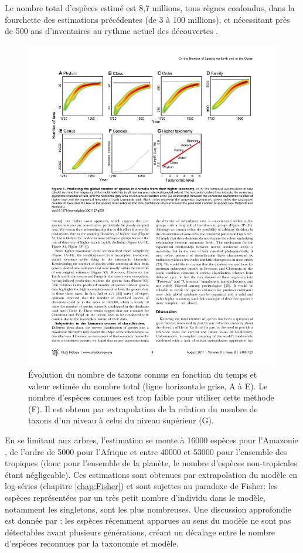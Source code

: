 \documentclass[
  11pt,
  french,
  a4paper,
  extrafontsizes,onecolumn,openright
  ]{memoir}
\begin{document}
Le nombre total d'espèces estimé est 8,7 millions, tous règnes confondus, dans la fourchette des estimations précédentes (de 3 à 100 millions), et nécessitant près de 500 ans d'inventaires au rythme actuel des découvertes \autocite{May2011}.



\scriptsize

\begin{figure}

{\centering \includegraphics[width=0.8\linewidth]{images/Mora2011} 

}

\caption{Évolution du nombre de taxons connus en fonction du temps et valeur estimée du nombre total (ligne horizontale grise, A à E). Le nombre d'espèces connues est trop faible pour utiliser cette méthode (F). Il est obtenu par extrapolation de la relation du nombre de taxons d'un niveau à celui du niveau supérieur (G).}\label{fig:Mora2011}
\end{figure}

\normalsize

En se limitant aux arbres, l'estimation se monte à 16000 espèces pour l'Amazonie \autocite{TerSteege2013}, de l'ordre de 5000 pour l'Afrique et entre 40000 et 53000 pour l'ensemble des tropiques \autocite{Slik2015} (donc pour l'ensemble de la planète, le nombre d'espèces non-tropicales étant négligeable).
Ces estimations sont obtenues par extrapolation du modèle en log-séries (chapitre \ref{chap:Fisher}) et sont sujettes au paradoxe de Fisher: les espèces représentées par un très petit nombre d'individu dans le modèle, notamment les singletons, sont les plus nombreuses.
Une discussion approfondie est donnée par \textcite{Hubbell2015}: les espèces récemment apparues au sens du modèle ne sont pas détectables avant plusieurs générations, créant un décalage entre le nombre d'espèces reconnues par la taxonomie et modèle.
\end{document}

